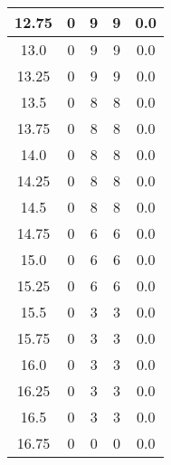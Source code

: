 \documentclass[letterpaper, 12pt]{article}
\begin{document}
\begin{longtable}{|c|c|c|c|c|}
\hline
12.75 & 0 & 9 & 9 & 0.0 \\
\hline
13.0 & 0 & 9 & 9 & 0.0 \\
\hline
13.25 & 0 & 9 & 9 & 0.0 \\
\hline
13.5 & 0 & 8 & 8 & 0.0 \\
\hline
13.75 & 0 & 8 & 8 & 0.0 \\
\hline
14.0 & 0 & 8 & 8 & 0.0 \\
\hline
14.25 & 0 & 8 & 8 & 0.0 \\
\hline
14.5 & 0 & 8 & 8 & 0.0 \\
\hline
14.75 & 0 & 6 & 6 & 0.0 \\
\hline
15.0 & 0 & 6 & 6 & 0.0 \\
\hline
15.25 & 0 & 6 & 6 & 0.0 \\
\hline
15.5 & 0 & 3 & 3 & 0.0 \\
\hline
15.75 & 0 & 3 & 3 & 0.0 \\
\hline
16.0 & 0 & 3 & 3 & 0.0 \\
\hline
16.25 & 0 & 3 & 3 & 0.0 \\
\hline
16.5 & 0 & 3 & 3 & 0.0 \\
\hline
16.75 & 0 & 0 & 0 & 0.0 \\
\hline
\end{longtable}
\end{document}
